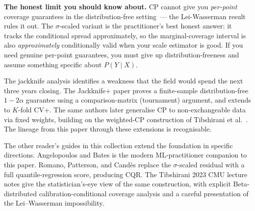 \documentclass[letterpaper,11pt,leqno]{article}
\newcommand{\bib}{paper.bib}
\begin{document}
\begin{whymatters}
\textbf{The honest limit you should know about.} CP cannot give you \emph{per-point} coverage guarantees in the distribution-free setting~--- the Lei-Wasserman result rules it out. The $\sigma$-scaled variant is the practitioner's best honest answer: it tracks the conditional spread approximately, so the marginal-coverage interval is also \emph{approximately} conditionally valid when your scale estimator is good. If you need genuine per-point guarantees, you must give up distribution-freeness and assume something specific about $P(Y \mid X)$.
\end{whymatters}

The jackknife analysis identifies a weakness that the field would spend the next three years closing. The Jackknife+ paper \cite{barber2021jackknifeplus} proves a finite-sample distribution-free $1 - 2\alpha$ guarantee using a comparison-matrix (tournament) argument, and extends to $K$-fold CV+. The same authors later generalise CP to non-exchangeable data via fixed weights, building on the weighted-CP construction of Tibshirani et al.\ \cite{tibshirani2019weighted}. The lineage from this paper through these extensions is recognisable.

The other reader's guides in this collection extend the foundation in specific directions. Angelopoulos and Bates \cite{angelopoulos2022gentle} is the modern ML-practitioner companion to this paper. Romano, Patterson, and Cand\`es \cite{romano2019cqr} replace the $\sigma$-scaled residual with a full quantile-regression score, producing CQR. The Tibshirani 2023 CMU lecture notes give the statistician's-eye view of the same construction, with explicit Beta-distributed calibration-conditional coverage analysis and a careful presentation of the Lei--Wasserman impossibility.


\end{document}
